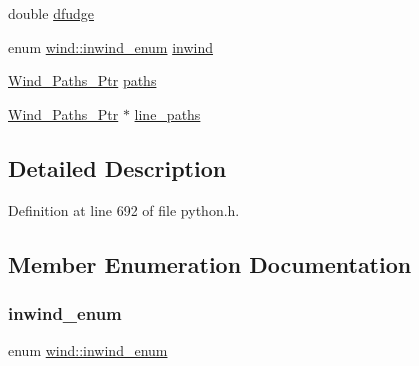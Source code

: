 \begin{DoxyCompactItemize}
\item 
double \hyperlink{structwind_a9e48704d3e2881e8cd2fef227c0ba8cd}{dfudge}
\item 
enum \hyperlink{structwind_a0cb1b3175908a106ae86ce77d5d2a8a4}{wind\+::inwind\+\_\+enum} \hyperlink{structwind_a7f4f2ec3bc9cea1d4dec351b026b9a73}{inwind}
\item 
\hyperlink{python_8h_af5cbc81f9fbd8ac7596e3a989073df45}{Wind\+\_\+\+Paths\+\_\+\+Ptr} \hyperlink{structwind_a35413d90b5539e3c14b74a7e0fb7dbac}{paths}
\item 
\hyperlink{python_8h_af5cbc81f9fbd8ac7596e3a989073df45}{Wind\+\_\+\+Paths\+\_\+\+Ptr} $\ast$ \hyperlink{structwind_a131a30d1943ba6394b7d74328d9374b7}{line\+\_\+paths}
\end{DoxyCompactItemize}


\subsection{Detailed Description}


Definition at line 692 of file python.\+h.



\subsection{Member Enumeration Documentation}
\mbox{\label{structwind_a0cb1b3175908a106ae86ce77d5d2a8a4}} 
\subsubsection{\texorpdfstring{inwind\+\_\+enum}{inwind\_enum}}
{\footnotesize\ttfamily enum \hyperlink{structwind_a0cb1b3175908a106ae86ce77d5d2a8a4}{wind\+::inwind\+\_\+enum}}

